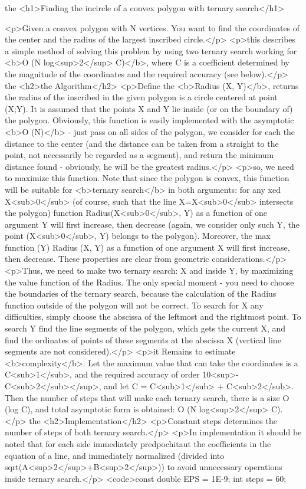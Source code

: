 the <h1>Finding the incircle of a convex polygon with ternary search</h1>

<p>Given a convex polygon with N vertices. You want to find the coordinates of the center and the radius of the largest inscribed circle.</p>
<p>this describes a simple method of solving this problem by using two ternary search working for <b>O (N log<sup>2</sup> C)</b>, where C is a coefficient determined by the magnitude of the coordinates and the required accuracy (see below).</p>
the <h2>the Algorithm</h2>
<p>Define the <b>Radius (X, Y)</b>, returns the radius of the inscribed in the given polygon is a circle centered at point (X;Y). It is assumed that the points X and Y lie inside (or on the boundary of) the polygon. Obviously, this function is easily implemented with the asymptotic <b>O (N)</b> - just pass on all sides of the polygon, we consider for each the distance to the center (and the distance can be taken from a straight to the point, not necessarily be regarded as a segment), and return the minimum distance found - obviously, he will be the greatest radius.</p>
<p>so, we need to maximize this function. Note that since the polygon is convex, this function will be suitable for <b>ternary search</b> in both arguments: for any xed X<sub>0</sub> (of course, such that the line X=X<sub>0</sub> intersects the polygon) function Radius(X<sub>0</sub>, Y) as a function of one argument Y will first increase, then decrease (again, we consider only such Y, the point (X<sub>0</sub>, Y) belongs to the polygon). Moreover, the max function (Y) { Radius (X, Y) } as a function of one argument X will first increase, then decrease. These properties are clear from geometric considerations.</p>
<p>Thus, we need to make two ternary search: X and inside Y, by maximizing the value function of the Radius. The only special moment - you need to choose the boundaries of the ternary search, because the calculation of the Radius function outside of the polygon will not be correct. To search for X any difficulties, simply choose the abscissa of the leftmost and the rightmost point. To search Y find the line segments of the polygon, which gets the current X, and find the ordinates of points of these segments at the abscissa X (vertical line segments are not considered).</p>
<p>it Remains to estimate <b>complexity</b>. Let the maximum value that can take the coordinates is a C<sub>1</sub>, and the required accuracy of order 10<sup>-C<sub>2</sub></sup>, and let C = C<sub>1</sub> + C<sub>2</sub>. Then the number of steps that will make each ternary search, there is a size O (log C), and total asymptotic form is obtained: O (N log<sup>2</sup> C).</p>
the <h2>Implementation</h2>
<p>Constant steps determines the number of steps of both ternary search.</p>
<p>In implementation it should be noted that for each side immediately predpochitaut the coefficients in the equation of a line, and immediately normalized (divided into sqrt(A<sup>2</sup>+B<sup>2</sup>)) to avoid unnecessary operations inside ternary search.</p>
<code>const double EPS = 1E-9;
int steps = 60;

